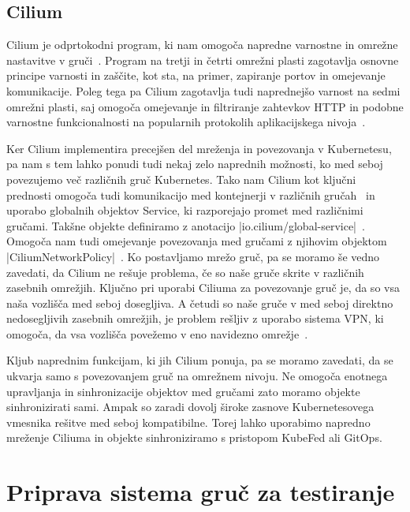 \documentclass[a4paper, 12pt]{book}
\begin{document}
\section{Cilium}
Cilium je odprtokodni program, ki nam omogoča napredne varnostne in omrežne nastavitve v gruči~\cite{cilium-intro}.
Program na tretji in četrti omrežni plasti zagotavlja osnovne principe varnosti in zaščite, kot sta, na primer, zapiranje portov in omejevanje komunikacije.
Poleg tega pa Cilium zagotavlja tudi naprednejšo varnost na sedmi omrežni plasti, saj omogoča omejevanje in filtriranje zahtevkov HTTP in podobne varnostne funkcionalnosti na popularnih protokolih aplikacijskega nivoja~\cite{cilium-intro}.

Ker Cilium implementira precejšen del mreženja in povezovanja v Kubernetesu, pa nam s tem lahko ponudi tudi nekaj zelo naprednih možnosti, ko med seboj povezujemo več različnih gruč Kubernetes.
Tako nam Cilium kot ključni prednosti omogoča tudi komunikacijo med kontejnerji v različnih gručah~\cite{cilium-cluster-mesh} in uporabo globalnih objektov Service, ki razporejajo promet med različnimi gručami.
Takšne objekte definiramo z anotacijo \spverb|io.cilium/global-service|~\cite{setup-cilium-cluster-mesh}.
Omogoča nam tudi omejevanje povezovanja med gru\-ča\-mi z njihovim objektom \spverb|CiliumNetworkPolicy|~\cite{setup-cilium-cluster-mesh}.
Ko postavljamo mre\-žo gruč, pa se moramo še vedno zavedati, da Cilium ne rešuje problema, če so naše gruče skrite v različnih zasebnih omrežjih.
Ključno pri uporabi Ciliuma za povezovanje gruč je, da so vsa naša vozlišča med seboj dosegljiva.
A četudi so naše gruče v med seboj direktno nedosegljivih zasebnih omrežjih, je problem rešljiv z uporabo sistema VPN, ki omogoča, da vsa vozlišča povežemo v eno navidezno omrežje~\cite{setup-cilium-cluster-mesh}.

Kljub naprednim funkcijam, ki jih Cilium ponuja, pa se moramo zavedati, da se ukvarja samo s povezovanjem gruč na omrežnem nivoju.
Ne omogoča enotnega upravljanja in sinhronizacije objektov med gručami zato moramo objekte sinhronizirati sami.
Ampak so zaradi dovolj široke zasnove Kubernetesovega vmesnika rešitve med seboj kompatibilne.
Torej lahko uporabimo napredno mreženje Ciliuma in objekte sinhroniziramo s pristopom KubeFed ali GitOps.
\chapter{Priprava sistema gruč za testiranje}
\end{document}
